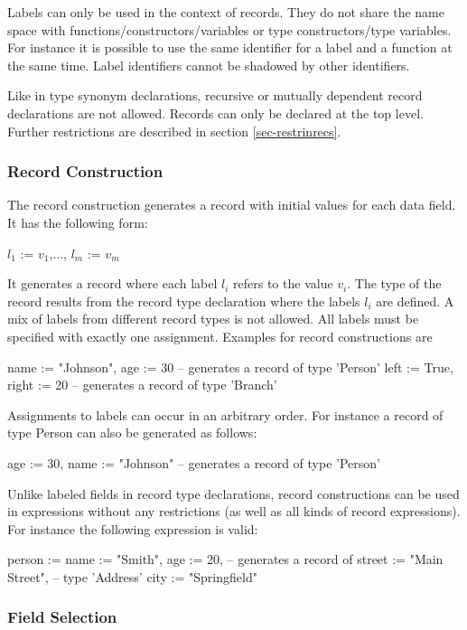 \documentclass[11pt,fleqn]{article}
\renewcommand{\tt}{\usefont{OT1}{cmtt}{m}{n}\selectfont}
\newcommand{\codefont}{\tt}
\newcommand{\code}[1]{\mbox{\codefont #1}}
\begin{document}
Labels can only be used in the context of
records. They do not share the name space with 
functions/constructors/variables or type constructors/type variables. 
For instance it is possible to use 
the same identifier for a label and a function at the same time. Label
identifiers cannot be shadowed by other identifiers.

Like in type synonym declarations, recursive or mutually 
dependent record declarations are not allowed. Records can only
be declared at the top level. Further restrictions are described in
section \ref{sec-restrinrecs}.


\subsubsection{Record Construction}
\label{sec-recordconstr}

The record construction generates a record with initial values for
each data field. It has the following form:
\begin{curry}
{ $l_1$ := $v_1$,$\ldots$, $l_m$ := $v_m$ }
\end{curry}
It generates a record where each label $l_i$ refers to the
value $v_i$. The type of the record results from the record type
declaration where the labels $l_i$ are defined.
A mix of labels from different
record types is not allowed. All labels must be specified with 
exactly one assignment. Examples for record constructions are
\begin{curry}
{name := "Johnson", age := 30}     -- generates a record of type 'Person'
{left := True, right := 20}        -- generates a record of type 'Branch'
\end{curry}
Assignments to labels can occur in an arbitrary order. For instance a
record of type \code{Person} can also be generated as follows:
\begin{curry}
{age := 30, name := "Johnson"}     -- generates a record of type 'Person'
\end{curry}
Unlike labeled fields in record type declarations, 
record constructions can be used in expressions without any restrictions
(as well as all kinds of record expressions). For instance the following
expression is valid:
\begin{curry}
{person := {name := "Smith", age := 20},   -- generates a record of
 street := "Main Street",                  -- type 'Address'
 city   := "Springfield"}
\end{curry}


\subsubsection{Field Selection}
\label{sec-fieldsel}
\end{document}
